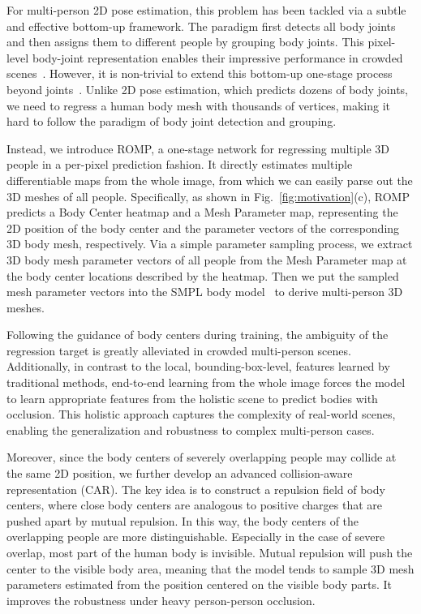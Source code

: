 \documentclass[10pt,twocolumn,letterpaper]{article}
\begin{document}
For multi-person 2D pose estimation, this problem has been tackled via a subtle and effective bottom-up framework. 
The paradigm first detects all body joints and then assigns them to different people by grouping body joints. 
This pixel-level body-joint representation enables their impressive performance in crowded scenes~\cite{openpose,cheng2020bottom,pishchulin2016deepcut}. 
However, it is non-trivial to extend this bottom-up one-stage process beyond joints~\cite{jiang2020coherent}.
Unlike 2D pose estimation, which predicts dozens of body joints, we need to regress a human body mesh with thousands of vertices, making it hard to follow the paradigm of body joint detection and grouping.


Instead, we introduce ROMP, a one-stage network for regressing multiple 3D people in a per-pixel prediction fashion.
It directly estimates multiple differentiable maps from the whole image, from which we can easily parse out the 3D meshes of all people.
Specifically, as shown in Fig.~\ref{fig:motivation}(c), ROMP predicts a Body Center heatmap and a Mesh Parameter map, representing the 2D position of the body center and the parameter vectors of the corresponding 3D body mesh, respectively.
Via a simple parameter sampling process, we extract 3D body mesh parameter vectors of all people from the Mesh Parameter map at the body center locations described by the heatmap. 
Then we put the sampled mesh parameter vectors into the SMPL body model~\cite{SMPL} to derive multi-person 3D meshes.

Following the guidance of body centers during training, the ambiguity of the regression target is greatly alleviated in crowded multi-person scenes. 
Additionally, in contrast to the local, bounding-box-level, features learned by traditional methods, end-to-end learning from the whole image forces the model to learn appropriate features from the holistic scene to predict bodies with occlusion.
This holistic approach captures the complexity of real-world scenes, enabling the generalization and robustness to complex multi-person cases.

Moreover, since the body centers of severely overlapping people may collide at the same 2D position, we further develop an advanced collision-aware representation (CAR). 
The key idea is to construct a repulsion field of body centers, where close body centers are analogous to positive charges that are pushed apart by mutual repulsion. In this way, the body centers of the overlapping people are more distinguishable. Especially in the case of severe overlap, most part of the human body is invisible. Mutual repulsion will push the center to the visible body area, meaning that the model tends to sample 3D mesh parameters estimated from the position centered on the visible body parts. It improves the robustness under heavy person-person occlusion. 
\end{document}
